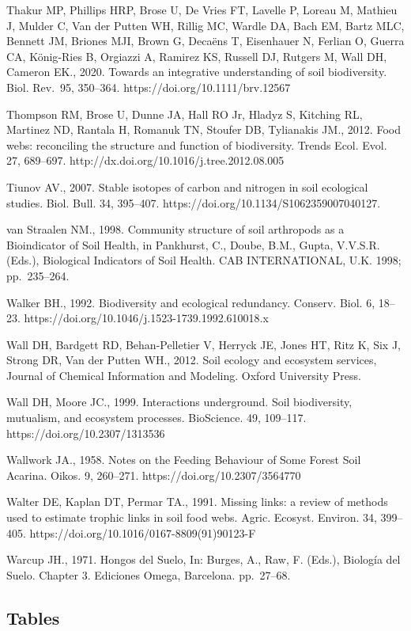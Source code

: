 \documentclass[11pt]{article}
\begin{document}
Thakur MP, Phillips HRP, Brose U, De Vries FT, Lavelle P, Loreau M,
Mathieu J, Mulder C, Van der Putten WH, Rillig MC, Wardle DA, Bach EM,
Bartz MLC, Bennett JM, Briones MJI, Brown G, Decaëns T, Eisenhauer N,
Ferlian O, Guerra CA, König‐Ries B, Orgiazzi A, Ramirez KS, Russell DJ,
Rutgers M, Wall DH, Cameron EK., 2020. Towards an integrative
understanding of soil biodiversity. Biol. Rev.~95, 350--364.
https://doi.org/10.1111/brv.12567

Thompson RM, Brose U, Dunne JA, Hall RO Jr, Hladyz S, Kitching RL,
Martinez ND, Rantala H, Romanuk TN, Stoufer DB, Tylianakis JM., 2012.
Food webs: reconciling the structure and function of biodiversity.
Trends Ecol. Evol. 27, 689--697.
http://dx.doi.org/10.1016/j.tree.2012.08.005

Tiunov AV., 2007. Stable isotopes of carbon and nitrogen in soil
ecological studies. Biol. Bull. 34, 395--407.
https://doi.org/10.1134/S1062359007040127.

van Straalen NM., 1998. Community structure of soil arthropods as a
Bioindicator of Soil Health, in Pankhurst, C., Doube, B.M., Gupta,
V.V.S.R. (Eds.), Biological Indicators of Soil Health. CAB
INTERNATIONAL, U.K. 1998; pp.~235--264.

Walker BH., 1992. Biodiversity and ecological redundancy. Conserv. Biol.
6, 18--23. https://doi.org/10.1046/j.1523-1739.1992.610018.x

Wall DH, Bardgett RD, Behan-Pelletier V, Herryck JE, Jones HT, Ritz K,
Six J, Strong DR, Van der Putten WH., 2012. Soil ecology and ecosystem
services, Journal of Chemical Information and Modeling. Oxford
University Press.

Wall DH, Moore JC., 1999. Interactions underground. Soil biodiversity,
mutualism, and ecosystem processes. BioScience. 49, 109--117.
https://doi.org/10.2307/1313536

Wallwork JA., 1958. Notes on the Feeding Behaviour of Some Forest Soil
Acarina. Oikos. 9, 260--271. https://doi.org/10.2307/3564770

Walter DE, Kaplan DT, Permar TA., 1991. Missing links: a review of
methods used to estimate trophic links in soil food webs. Agric.
Ecosyst. Environ. 34, 399--405.
https://doi.org/10.1016/0167-8809(91)90123-F

Warcup JH., 1971. Hongos del Suelo, In: Burges, A., Raw, F. (Eds.),
Biología del Suelo. Chapter 3. Ediciones Omega, Barcelona. pp.~27--68.

\newpage

\hypertarget{tables}{%
\subsection{Tables}\label{tables}}
\end{document}
